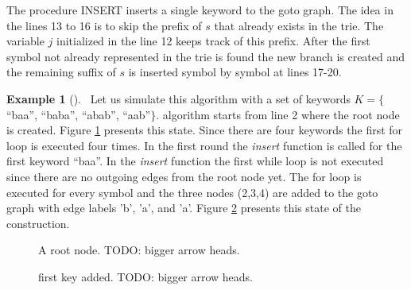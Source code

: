 \documentclass[english,twoside,censored,csm,algorithms-track-2020]{HYthesisML}
\theoremstyle{plain}
\theoremstyle{definition}
\newtheorem{example}[theorem]{Example}
\begin{document}
  The procedure \textsc{INSERT} inserts a single keyword to the goto graph. The idea in the lines
  13 to 16 is to skip the prefix of $s$ that already exists in the trie. The variable $j$ initialized
  in the line 12 keeps track of this prefix. After the first symbol not already represented in the
  trie is found the new branch is created and the remaining suffix of $s$ is inserted symbol by symbol
  at lines 17-20.

  \begin{example}[]~\label{exmp-goto}
  Let us simulate this algorithm with a set of keywords $K=\{$``baa'', ``baba'', ``abab'', ``aab''$\}$.
  algorithm starts from line 2 where the root node is created. Figure \ref{fig-ac-step1}
  presents this state. Since there are four keywords the first for loop is executed four times.
  In the first round the \textit{insert} function is called for the first keyword ``baa''.
  In the \textit{insert} function the first while loop is not executed since there are no
  outgoing edges from the root node yet. The for loop is executed for every symbol and the three
  nodes (2,3,4) are added to the goto graph with edge labels 'b', 'a', and 'a'.
  Figure \ref{fig-ac-step2} presents this state of the construction.


  \begin{figure}[h]
  \centering
  \caption{A root node. TODO: bigger arrow heads.} \label{fig-ac-step1}
  \end{figure}

  \begin{figure}[h]
  \centering
  \caption{first key added. TODO: bigger arrow heads.} \label{fig-ac-step2}
\end{figure}


\end{example}
\end{document}
